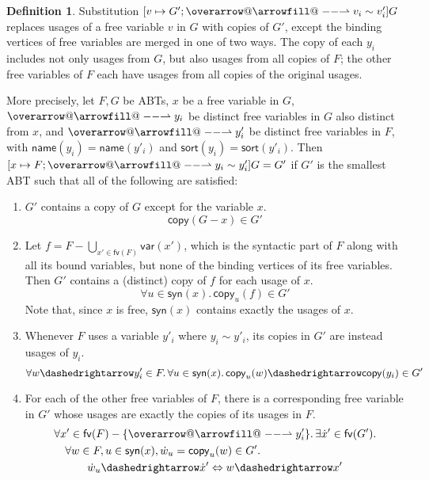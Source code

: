 \documentclass[11pt]{article} %
\makeatletter
\theoremstyle{definition}
\newtheorem{dfn}{Definition}
\def\rightharpoonupfill@{\arrowfill@\relbar\relbar\rightharpoonup}
\newcommand{\harpvec}{%
   \mathpalette{\overarrow@\rightharpoonupfill@}}
\makeatother
\begin{document}
\begin{dfn}
Substitution $[v \mapsto G'; \harpvec{v_i \sim v'_i}]G$ replaces usages of a free variable $v$ in $G$ with copies of $G'$, except the binding vertices of free variables are merged in one of two ways.
The copy of each $y_i$ includes not only usages from $G$, but also usages from all copies of $F$;
the other free variables of $F$ each have usages from all copies of the original usages.

More precisely, let $F, G$ be ABTs, $x$ be a free variable in $G$, $\harpvec{y_i}$ be distinct free variables in $G$ also distinct from $x$, and $\harpvec{y'_i}$ be distinct free variables in $F$, with $\mathsf{name}(y_i) = \mathsf{name}(y'_i)$ and $\mathsf{sort}(y_i) = \mathsf{sort}(y'_i)$.
Then $[x \mapsto F; \harpvec{y_i \sim y'_i}]G = G'$ if $G'$ is the smallest ABT such that all of the following are satisfied:
\begin{enumerate}[label=\alph*)]
\item $G'$ contains a copy of $G$ except for the variable $x$.
    $$\mathsf{copy}(G-x) \in G'$$
\item Let $f = F - \bigcup_{x' \in \mathsf{fv}(F)}\mathsf{var}(x')$, which is the syntactic part of $F$ along with all its bound variables, but none of the binding vertices of its free variables.
    Then $G'$ contains a (distinct) copy of $f$ for each usage of $x$.
    $$\forall u \in \mathsf{syn}(x).\, \mathsf{copy}_u(f) \in G'$$
    Note that, since $x$ is free, $\mathsf{syn}(x)$ contains exactly the usages of $x$.
\item Whenever $F$ uses a variable $y'_i$ where $y_i \sim y'_i$, its copies in $G'$ are instead usages of $y_i$.
    $$\forall w \dashedrightarrow y'_i \in F.\,
        \forall u \in \mathsf{syn}(x).\,
        \mathsf{copy}_u(w) \dashedrightarrow \mathsf{copy}(y_i) \in G'$$
\item For each of the other free variables of $F$, there is a corresponding free variable in $G'$ whose usages are exactly the copies of its usages in $F$.
    \begin{align*}
    & \forall x' \in \mathsf{fv}(F) - \{\harpvec{y'_i}\}.\,
        \exists \dot x' \in \mathsf{fv}(G'). \\
    &\quad \forall w \in F,
        u \in \mathsf{syn}(x),
        \dot w_u = \mathsf{copy}_u(w) \in G'. \\
    & \quad\qquad
            \dot w_u \dashedrightarrow \dot x' \Leftrightarrow w \dashedrightarrow x'
    \end{align*}
\end{enumerate}
\end{dfn}
\end{document}
